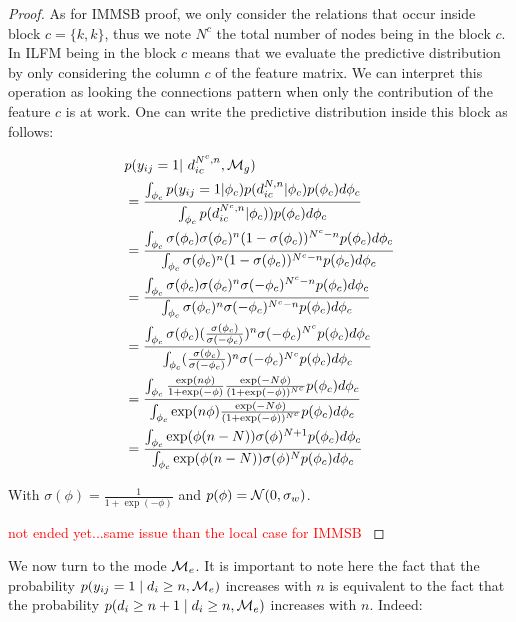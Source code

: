 \begin{proof}
As for IMMSB proof, we only consider the relations  that occur inside block $c=\{k,k\}$, thus we note $N^c$ the total number of nodes being in the block $c$. In ILFM being in the block $c$ means that we evaluate the predictive distribution by only considering the column $c$ of the feature matrix. We can interpret this operation as looking the connections pattern when only the contribution of the feature $c$ is at work. One can write the predictive distribution inside this block as follows:

\begin{align*}
&\p(y_{ij}=1 | d_{ic}^{N^c,n}, \M_g)  \\
&=  \frac{ \int_{\phi_{c}} p(y_{ij}=1|\phi_{c}) p(d_{ic}^{N,n} | \phi_{c}) p(\phi_{c}) d\phi_{c}}{\int_{\phi_{c}} \p(d_{ic}^{N^c,n} | \phi_{c}))       p(\phi_{c}) d\phi_{c}} \\
&= \frac{ \int_{\phi_{c}} \sigma(\phi_c) \sigma(\phi_c)^n (1-\sigma(\phi_c))^{N^c-n}     p(\phi_{c}) d\phi_{c}}{\int_{\phi_{c}}  \sigma(\phi_c)^n (1-\sigma(\phi_c))^{N^c-n}      p(\phi_{c}) d\phi_{c}} \\
&= \frac{ \int_{\phi_{c}} \sigma(\phi_c) \sigma(\phi_c)^n \sigma(-\phi_c)^{N^c-n}     p(\phi_{c}) d\phi_{c}}{\int_{\phi_{c}}  \sigma(\phi_c)^n \sigma(-\phi_c)^{N^c-n}      p(\phi_{c}) d\phi_{c}} \\
&= \frac{ \int_{\phi_{c}} \sigma(\phi_c) (\frac{\sigma(\phi_c)}{\sigma(-\phi_c)})^n \sigma(-\phi_c)^{N^c}     p(\phi_{c}) d\phi_{c}}{\int_{\phi_{c}}  (\frac{\sigma(\phi_c)}{\sigma(-\phi_c)})^n \sigma(-\phi_c)^{N^c}     p(\phi_{c}) d\phi_{c}} \\
&= \frac{ \int_{\phi_{c}} \frac{\exp(n\phi)}{1+\exp(-\phi)} \frac{\exp(-N\phi)}{(1+\exp(-\phi))^{N^c}}  p(\phi_{c}) d\phi_{c}}{\int_{\phi_{c}}  \exp(n\phi) \frac{\exp(-N\phi)}{(1+\exp(-\phi))^{N^c}}   p(\phi_{c}) d\phi_{c}} \\
&= \frac{ \int_{\phi_{c}} \exp(\phi(n-N)) \sigma(\phi)^{N+1} p(\phi_{c}) d\phi_{c}}{\int_{\phi_{c}} \exp(\phi(n-N)) \sigma(\phi)^{N} p(\phi_{c}) d\phi_{c}} \\
\end{align*}

With $\sigma(\phi) = \frac{1}{1+\exp(-\phi)}$ and $p(\phi) = \mathcal{N}(0, \sigma_w)$.


\textcolor{red}{not ended yet...same issue than the local case for IMMSB }
\end{proof}

We now turn to the mode $\mathcal{M}_e$. It is important to note here the fact that the probability $p(y_{ij}=1 \mid d_i \ge n, \mathcal{M}_e)$ increases with $n$ is equivalent to the fact that the probability $p(d_{i} \ge n+1 \mid d_i \ge n, \mathcal{M}_e)$ increases with $n$. Indeed:


